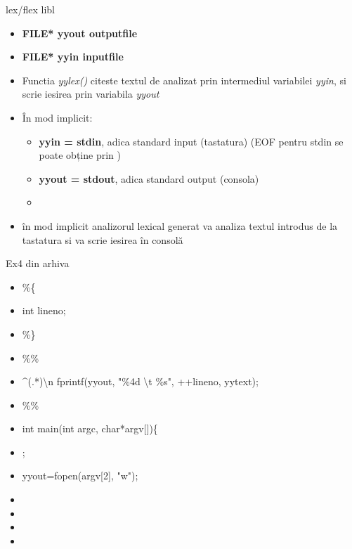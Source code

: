 \documentclass[pdf]{beamer}
\begin{document}
\begin{frame}{lex/flex libl}
\begin{itemize}
\item
\textbf{\color{red}FILE* yyout \hspace{3mm} outputfile}
\item
\textbf{\color {red} FILE* yyin \hspace{12mm} inputfile}
\item
Functia \textit{yylex()} citeste textul de analizat prin intermediul variabilei \textit{yyin}, si scrie iesirea prin variabila \textit{yyout}
\newline

\item
În mod implicit:
\begin{itemize}
\item
\textbf{ yyin = stdin}, adica standard input (tastatura) (EOF pentru stdin se poate obține prin \textbf{\color{red}{CTRL+D}})
\item
\textbf{yyout = stdout}, adica standard output (consola) 
\item
 
\end{itemize}

\item
în mod implicit analizorul lexical generat va analiza textul introdus de la tastatura si va scrie iesirea în consolă

\end{itemize}
\end{frame}



\begin{frame}{Ex4 din arhiva}
\begin{itemize}
\item[]
\%\{
\item[]
int lineno;
\item[]
\%\}
\item[]
\%\%
\item[]
\^{}(.*)\textbackslash n fprintf(yyout, "\%4d \textbackslash t \%s", ++lineno, yytext);
\item[]
\%\%
\item[]
int main(int argc, char*argv[])\{
\item[]
\color{red}{yyin=fopen(argv[1], "r")};
\item[]
yyout=fopen(argv[2], "w");
\item[]
\item[]
\item[]
\item[]
\color{black}{\}}

\end{itemize}
\end{frame}
\end{document}
